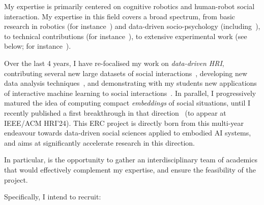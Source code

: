 My expertise is primarily centered on cognitive robotics and human-robot social
interaction. My expertise in this field covers a broad spectrum, from basic
research in robotics (for
instance~\cite{lemaignan2014dynamics,lemaignan2015mutual}) and data-driven
socio-psychology
(including~\cite{lemaignan2014cognitive,irfan2018social,winkle2019effective,bartlett2019what}),
to technical contributions (for instance~\cite{lemaignan2010oro,
lemaignan2017artificial, lemaignan2018underworlds}), to extensive experimental
work (see below; for instance~\cite{hood2015cowriter,winkle2020couch,
lemaignan2022social}).

Over the last 4 years, I have re-focalised my work on \emph{data-driven HRI},
contributing several new large datasets of social
interactions~\cite{lemaignan2018pinsoro,sallami2020unexpected,webb2023sogrin},
developing new data analysis
techniques~\cite{bartlett2019what,webb2022measuring}, and demonstrating with my
students new applications of interactive machine learning to social
interactions~\cite{senft2016sparc,winkle2020couch,winkle2021leador}.  In
parallel, I progressively matured the idea of computing compact
\emph{embeddings} of social situations, until I recently published a first
breakthrough in that direction~\cite{lemaignan2024social} (to appear at IEEE/ACM
HRI'24). This ERC project is directly born from this multi-year endeavour
towards data-driven social sciences applied to embodied AI systems, and aims at
significantly accelerate research in this direction.

In particular, \project is the opportunity to gather an interdisciplinary team
of academics that would effectively complement my expertise, and ensure the
feasibility of the project.

Specifically, I intend to recruit:

